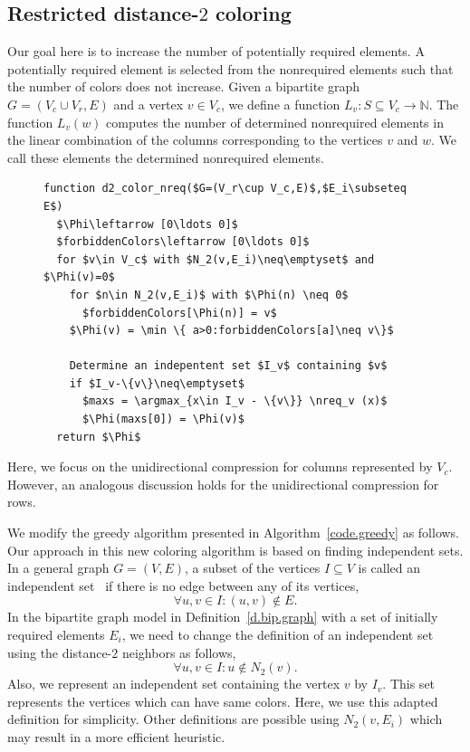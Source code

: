 \documentclass[12pt, twoside,a4paper,toc=bibliography]{scrbook}
\DeclareMathOperator*{\argmax}{arg\,max}
\newcommand{\defref}[1]{Definition~\protect\ref{#1}}
\newcommand{\coderef}[1]{Algorithm~\protect\ref{#1}}
\newcommand{\nreq}{L}
\begin{document}
\subsection{Restricted distance-$2$ coloring}
Our goal here is to increase the number of potentially required elements.
A potentially required element is selected from the nonrequired elements such that
the number of colors does not increase.
Given a bipartite graph $G=(V_c\cup V_r,E)$ and a vertex $v\in V_c$, 
we define a function $\nreq_v:S\subseteq V_c\rightarrow \mathbb{N}$.
The function $\nreq_v(w)$ computes the number of determined nonrequired elements
in the linear combination of the columns corresponding to the vertices $v$ and $w$.
We call these elements the determined nonrequired elements.
\begin{figure}
\begin{lstlisting}[caption=New coloring heuristic for distance-$2$ coloring
considering the nonrequired elements.,label=code.new.d2.nreq,mathescape]
function d2_color_nreq($G=(V_r\cup V_c,E)$,$E_i\subseteq E$)
  $\Phi\leftarrow [0\ldots 0]$
  $forbiddenColors\leftarrow [0\ldots 0]$
  for $v\in V_c$ with $N_2(v,E_i)\neq\emptyset$ and $\Phi(v)=0$
    for $n\in N_2(v,E_i)$ with $\Phi(n) \neq 0$
      $forbiddenColors[\Phi(n)] = v$
    $\Phi(v) = \min \{ a>0:forbiddenColors[a]\neq v\}$

    Determine an indepentent set $I_v$ containing $v$
    if $I_v-\{v\}\neq\emptyset$
      $maxs = \argmax_{x\in I_v - \{v\}} \nreq_v (x)$
      $\Phi(maxs[0]) = \Phi(v)$
  return $\Phi$
\end{lstlisting}
\end{figure}
Here, we focus on the unidirectional compression for columns represented by $V_c$.
However, an analogous discussion holds for the unidirectional compression for rows.

We modify the greedy algorithm  presented in \coderef{code.greedy} as follows.
Our approach in this new coloring algorithm is based on finding independent sets.
In a general graph $G=(V,E)$, a subset of the vertices $I\subseteq V$ is
called an independent set~\cite{bondy2008graph} 
if there is no edge between any of its vertices,
$$\forall u,v\in I: (u,v)\notin E.$$
In the bipartite graph model in \defref{d.bip.graph} with a set of initially required elements $E_i$,
we need to change the definition of an independent set using the distance-$2$ neighbors as follows,
$$\forall u,v\in I: u\notin N_2(v).$$
Also, we represent an independent set containing the vertex $v$ by $I_v$.
This set represents the vertices which can have same colors.
Here, we use this adapted definition for simplicity. 
Other definitions are possible using $N_2(v,E_i)$ which
may result in a more efficient heuristic.
\end{document}
